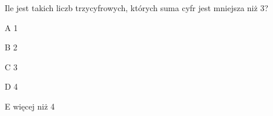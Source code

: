 \begin{tresc}
Ile jest takich liczb trzycyfrowych, których suma cyfr jest mniejsza niż 3?
\end{tresc}
\begin{wariant}{A} 1 \end{wariant}
\begin{wariant}{B} 2 \end{wariant}
\begin{wariant}{C} 3 \end{wariant}
\begin{wariant}{D} 4 \end{wariant}
\begin{wariant}{E} więcej niż 4 \end{wariant}
